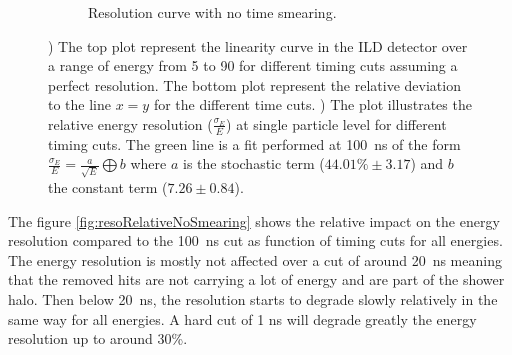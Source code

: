 \begin{figure}[htbp!]
  \hfill
  \begin{subfigure}[t]{0.45\textwidth}
    \centering
    \caption{Resolution curve with no time smearing.} \label{fig:resoNoSmearing}
  \end{subfigure}
  \caption{) The top plot represent the linearity curve in the ILD detector over a range of energy from 5 \GeV to 90 \GeV for different timing cuts assuming a perfect resolution. The bottom plot represent the relative deviation to the line $x=y$ for the different time cuts. ) The plot illustrates the relative energy resolution ($\frac{\sigma_{E}}{E}$) at single particle level for different timing cuts. The green line is a fit performed at \SI{100}{\nano\second} of the form $\frac{\sigma_{E}}{E} = \frac{a}{\sqrt{E}} \bigoplus b$ where $a$ is the stochastic term ($44.01\% \pm 3.17$) and $b$ the constant term ($7.26 \pm 0.84$).}
\end{figure}

The figure \ref{fig:resoRelativeNoSmearing} shows the relative impact on the energy resolution compared to the \SI{100}{\nano\second} cut as function of timing cuts for all energies. The energy resolution is mostly not affected over a cut of around \SI{20}{\nano\second} meaning that the removed hits are not carrying a lot of energy and are part of the shower halo. Then below \SI{20}{\nano\second}, the resolution starts to degrade slowly relatively in the same way for all energies. A hard cut of 1 ns will degrade greatly the energy resolution up to around 30\%.

